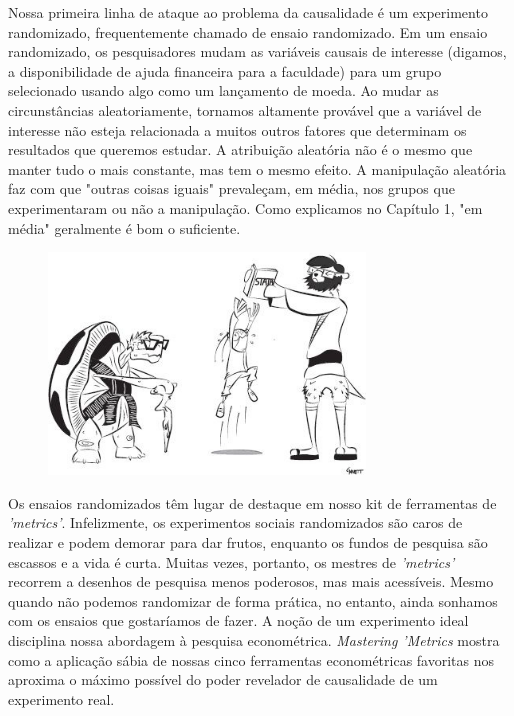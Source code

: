 \documentclass[a4paper,12pt]{article}[abntex2]
\begin{document}
Nossa primeira linha de ataque ao problema da causalidade é um experimento randomizado, frequentemente chamado de ensaio randomizado. Em um ensaio randomizado, os pesquisadores mudam as variáveis causais de interesse (digamos, a disponibilidade de ajuda financeira para a faculdade) para um grupo selecionado usando algo como um lançamento de moeda. Ao mudar as circunstâncias aleatoriamente, tornamos altamente provável que a variável de interesse não esteja relacionada a muitos outros fatores que determinam os resultados que queremos estudar. A atribuição aleatória não é o mesmo que manter tudo o mais constante, mas tem o mesmo efeito. A manipulação aleatória faz com que "outras coisas iguais" prevaleçam, em média, nos grupos que experimentaram ou não a manipulação. Como explicamos no Capítulo 1, "em média" geralmente é bom o suficiente.

\begin{figure}[H]
    \centering
    \includegraphics[width=0.75\textwidth]{PIBIC/Tradução Mater Metrics/image.png}
    
    \end{figure}

Os ensaios randomizados têm lugar de destaque em nosso kit de ferramentas de \emph{'metrics'}. Infelizmente, os experimentos sociais randomizados são caros de realizar e podem demorar para dar frutos, enquanto os fundos de pesquisa são escassos e a vida é curta. Muitas vezes, portanto, os mestres de \emph{'metrics'} recorrem a desenhos de pesquisa menos poderosos, mas mais acessíveis. Mesmo quando não podemos randomizar de forma prática, no entanto, ainda sonhamos com os ensaios que gostaríamos de fazer. A noção de um experimento ideal disciplina nossa abordagem à pesquisa econométrica. \emph{Mastering 'Metrics} mostra como a aplicação sábia de nossas cinco ferramentas econométricas favoritas nos aproxima o máximo possível do poder revelador de causalidade de um experimento real.
\end{document}
